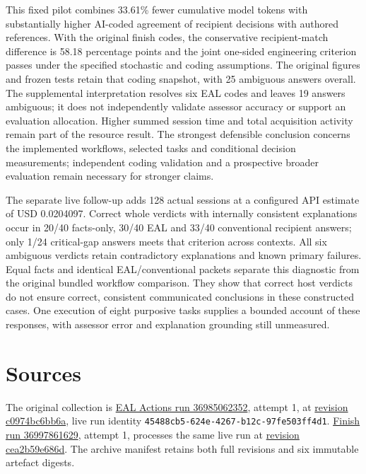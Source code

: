 \documentclass[preprint,11pt]{elsarticle}
\begin{document}
This fixed pilot combines 33.61\% fewer cumulative model tokens with
substantially higher AI-coded agreement of recipient decisions with
authored references. With the original finish codes, the conservative
recipient-match difference is 58.18 percentage points and the joint
one-sided engineering criterion passes under the specified stochastic
and coding assumptions. The original figures and frozen tests retain
that coding snapshot, with 25 ambiguous answers overall. The
supplemental interpretation resolves six EAL codes and leaves 19 answers
ambiguous; it does not independently validate assessor accuracy or
support an evaluation allocation. Higher summed session time and total
acquisition activity remain part of the resource result. The strongest
defensible conclusion concerns the implemented workflows, selected tasks
and conditional decision measurements; independent coding validation and
a prospective broader evaluation remain necessary for stronger claims.

The separate live follow-up adds 128 actual sessions at a configured API
estimate of USD 0.0204097. Correct whole verdicts with internally
consistent explanations occur in 20/40 facts-only, 30/40 EAL and 33/40
conventional recipient answers; only 1/24 critical-gap answers meets
that criterion across contexts. All six ambiguous verdicts retain
contradictory explanations and known primary failures. Equal facts and
identical EAL/conventional packets separate this diagnostic from the
original bundled workflow comparison. They show that correct host
verdicts do not ensure correct, consistent communicated conclusions in
these constructed cases. One execution of eight purposive tasks supplies
a bounded account of these responses, with assessor error and
explanation grounding still unmeasured.

\FloatBarrier

\hypertarget{sources}{%
\section{Sources}\label{sources}}

The original collection is
\href{https://github.com/emmett08/earl/actions/runs/36985062352}{EAL
Actions run 36985062352}, attempt 1, at
\href{https://github.com/emmett08/earl/commit/c0974bc6bb6a2df30d1423b6248bfc51b4d2a9d7}{revision
c0974bc6bb6a}, live run identity
\texttt{45488cb5-624e-4267-b12c-97fe503ff4d1}.
\href{https://github.com/emmett08/earl/actions/runs/36997861629}{Finish
run 36997861629}, attempt 1, processes the same live run at
\href{https://github.com/emmett08/earl/commit/cea2b59e686d57e0c071924f184b497919ec91a7}{revision
cea2b59e686d}. The archive manifest retains both full revisions and six
immutable artefact digests.
\end{document}
